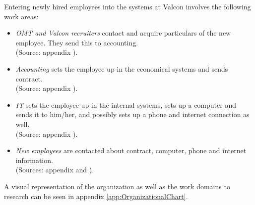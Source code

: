 Entering newly hired employees into the systems at Valcon involves the following work areas:

\begin{itemize}
\item \emph{OMT and Valcon recruiters} contact and acquire particulars of the new employee. They send this to accounting. \\
(Source: appendix ).

\item \emph{Accounting} sets the employee up in the economical systems and sends contract. \\
(Source: appendix ).

\item \emph{IT} sets the employee up in the internal systems, sets up a computer and sends it to him/her, and possibly sets up a phone and internet connection as well. \\
(Source: appendix ).

\item \emph{New employees} are contacted about contract, computer, phone and internet information. \\
(Sources: appendix  and ).

\end{itemize}

A visual representation of the organization as well as the work domains to research can be seen in appendix \ref{app:OrganizationalChart}.